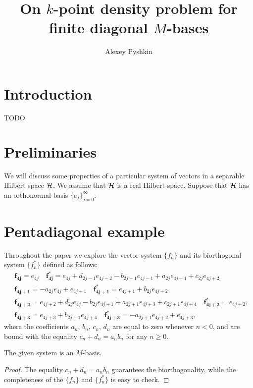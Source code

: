 \documentclass[12pt]{amsart}
\theoremstyle{case}
\begin{document}
\title{On $k$-point density problem for finite diagonal $M$-bases}
\author{Alexey Pyshkin}
\maketitle

\section{Introduction}
TODO
\section{Preliminaries}
  We will discuss some properties of a particular system of vectors in a separable Hilbert space $\cal{H}$.
  We assume that $\cal{H}$ is a real Hilbert space. 
  Suppose that $\cal{H}$ has an orthonormal basis $\{e_j\}_{j=0}^\infty$.



\section{Pentadiagonal example}
  Throughout the paper we explore the vector system $\{f_n\}$ and its biorthogonal system $\{f^*_n\}$ defined as follows:
  \begin{equation}
    \label{main-system}
    \begin{aligned}
      &\mathbf{f_{4j}} = e_{4j} \quad 
      \mathbf{f^*_{4j}} = e_{4j} + d_{2j - 1} e_{4j-2} - b_{2j-1} e_{4j-1} + a_{2j} e_{4j+1} + c_{2j} e_{4j+2}\\
      &\mathbf{f_{4j+1}} = -a_{2j} e_{4j} + e_{4j+1} \quad 
      \mathbf{f^*_{4j+1}} = e_{4j+1} + b_{2j} e_{4j+2},\\
      &\mathbf{f_{4j+2}} = e_{4j+2} + d_{2j} e_{4j} - b_{2j} e_{4j+1} + a_{2j+1} e_{4j+3} + c_{2j+1} e_{4j+4}\quad
      \mathbf{f^*_{4j+2}} = e_{4j+2},\\
      &\mathbf{f_{4j+3}} = e_{4j+3} + b_{2j+1} e_{4j+4}\quad
      \mathbf{f^*_{4j+3}} = -a_{2j+1} e_{4j+2} + e_{4j+3},
    \end{aligned}
  \end{equation}
    where the coefficients $a_n$, $b_n$, $c_n$, $d_n$ are equal to zero whenever $n < 0$, and are bound with the equality
      $c_n + d_n = a_n b_n$ for any $n \geq 0$. 
  \begin{prop}
    The given system is an $M$-basis.
  \end{prop}
  \begin{proof}
    The equality $c_n + d_n = a_n b_n$ guarantees the bi\-orthogonality,
      while the completeness of the $\{f_n\}$ and $\{f_n^*\}$ is easy to check.
  \end{proof}
\end{document}
